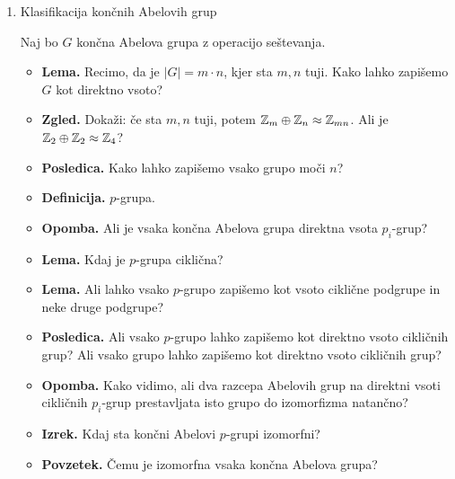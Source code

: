 \begin{enumerate}
    \item Klasifikacija končnih Abelovih grup
    
    Naj bo \(G\) končna Abelova grupa z operacijo seštevanja.
    \begin{itemize}
        \item \textbf{Lema.} Recimo, da je \(|G| = m \cdot n\), kjer sta \(m, n\) tuji. Kako lahko zapišemo \(G\) kot direktno vsoto?
        \item \textbf{Zgled.} Dokaži: če sta \(m, n\) tuji, potem \(\mathbb{Z}_m \oplus \mathbb{Z}_n \approx \mathbb{Z}_{mn}\). Ali je \(\mathbb{Z}_2 \oplus \mathbb{Z}_2 \approx \mathbb{Z}_4\)?
        \item \textbf{Posledica.} Kako lahko zapišemo vsako grupo moči \(n\)?
        \item \textbf{Definicija.} \(p\)-grupa.
        \item \textbf{Opomba.} Ali je vsaka končna Abelova grupa direktna vsota \(p_i\)-grup?
        \item \textbf{Lema.} Kdaj je \(p\)-grupa ciklična?
        \item \textbf{Lema.} Ali lahko vsako \(p\)-grupo zapišemo kot vsoto ciklične podgrupe in neke druge podgrupe?
        \item \textbf{Posledica.} Ali vsako \(p\)-grupo lahko zapišemo kot direktno vsoto cikličnih grup? Ali vsako grupo lahko zapišemo kot direktno vsoto cikličnih grup?
        \item \textbf{Opomba.} Kako vidimo, ali dva razcepa Abelovih grup na direktni vsoti cikličnih \(p_i\)-grup prestavljata isto grupo do izomorfizma natančno?
        \item \textbf{Izrek.} Kdaj sta končni Abelovi \(p\)-grupi izomorfni?
        \item \textbf{Povzetek.} Čemu je izomorfna vsaka končna Abelova grupa?
    \end{itemize}
\end{enumerate}